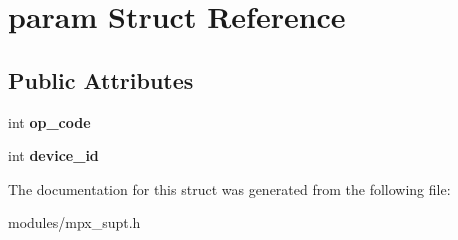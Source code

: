 \hypertarget{structparam}{}\section{param Struct Reference}
\label{structparam}
\subsection*{Public Attributes}
\begin{DoxyCompactItemize}
\item 
int {\bfseries op\+\_\+code}\hypertarget{structparam_a81c8b24055c2908ebe480598aba6044c}{}\label{structparam_a81c8b24055c2908ebe480598aba6044c}

\item 
int {\bfseries device\+\_\+id}\hypertarget{structparam_a44a7285b02749114186a9f9971941bcb}{}\label{structparam_a44a7285b02749114186a9f9971941bcb}

\end{DoxyCompactItemize}


The documentation for this struct was generated from the following file\+:\begin{DoxyCompactItemize}
\item 
modules/mpx\+\_\+supt.\+h\end{DoxyCompactItemize}
